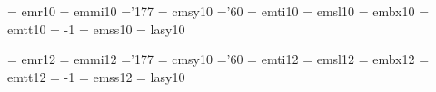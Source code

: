  \font\elvrm  = emr10    \@halfmag %
 \font\elvmi  = emmi10   \@halfmag %
    \skewchar\elvmi ='177          %
 \font\elvsy  = cmsy10   \@halfmag %
    \skewchar\elvsy ='60           %
 \font\elvit  = emti10   \@halfmag %
 \font\elvsl  = emsl10   \@halfmag %
 \font\elvbf  = embx10   \@halfmag %
 \font\elvtt  = emtt10   \@halfmag %
    \hyphenchar\elvtt = -1         %
 \font\elvsf  = emss10   \@halfmag %
 \font\elvly  = lasy10  \@halfmag %
 
 \font\twlrm  = emr12                 %
 \font\twlmi  = emmi12               %
    \skewchar\twlmi ='177          %
 \font\twlsy  = cmsy10    %
    \skewchar\twlsy ='60           %
 \font\twlit  = emti12               %
 \font\twlsl  = emsl12               %
 \font\twlbf  = embx12               %
 \font\twltt  = emtt12               %
    \hyphenchar\twltt = -1         %
 \font\twlsf  = emss12               %
 \font\twlly  = lasy10   %
 
